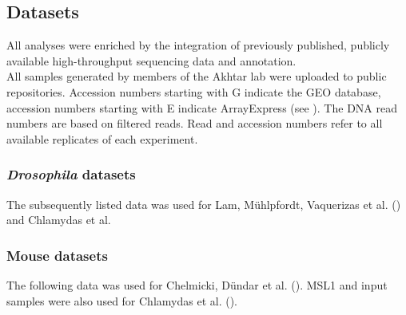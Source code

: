 \subsection{Datasets}
\label{Datasets}
All analyses were enriched by the integration of previously published, publicly available high-throughput sequencing data and annotation.\\
%

%
All samples generated by members of the Akhtar lab were uploaded to public repositories. Accession numbers starting with G indicate the GEO database, accession numbers starting with E indicate ArrayExpress (see ). The DNA read numbers are based on filtered reads. Read and accession numbers refer to all available replicates of each experiment.
%
\subsubsection{\textit{Drosophila} datasets}
%
The subsequently listed data was used for Lam, Mühlpfordt, Vaquerizas et al. \citep{Lam2012} () and Chlamydas et al.\\

\clearpage


\subsubsection{Mouse datasets}
The following data was used for Chelmicki, Dündar et al.\citep{Chelmicki2014} (). MSL1 and input samples were also used for Chlamydas et al. (). \\



